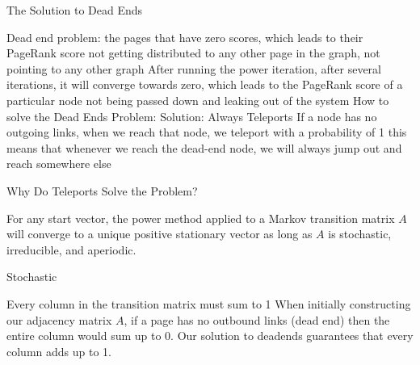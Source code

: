 \documentclass{beamer}
\begin{document}
\begin{frame}[t]{The Solution to Dead Ends}
\begin{outline}
\1 Dead end problem: the pages that have zero scores, which leads to their PageRank score not getting distributed to any other page in the graph, not pointing to any other graph
\1 After running the power iteration, after several iterations, it will converge towards zero, which leads to the PageRank score of a particular node not being passed down and leaking out of the system
\1 How to solve the Dead Ends Problem:
        \2 Solution: Always Teleports
        \2 If a node has no outgoing links, when we reach that node, we teleport with a probability of 1
        \2 this means that whenever we reach the dead-end node, we will always jump out and reach somewhere else
\end{outline}
\end{frame}
    
\begin{frame}[t]{Why Do Teleports Solve the Problem?}
\begin{outline}
\1 For any start vector, the power method applied to a Markov transition matrix $A$ will converge to a unique positive stationary vector as long as $A$ is stochastic, irreducible, and aperiodic.
\end{outline}
\end{frame}
   
\begin{frame}[t]{Stochastic}
\begin{outline}
    \1 Every column in the transition matrix must sum to 1
    \1 When initially constructing our adjacency matrix $A$, if a page has no outbound links (dead end) then the entire column would sum up to 0.
    \1 Our solution to deadends guarantees that every column adds up to 1.
\end{outline}
\end{frame}
\end{document}
